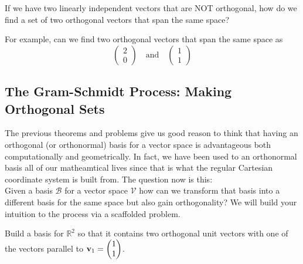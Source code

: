 \begin{problem}
    If we have two linearly independent vectors that are NOT orthogonal, how do
    we find a set of two orthogonal vectors that span the same space?

    For example, can we find two orthogonal vectors that span the same space as
    \[ \begin{pmatrix} 2 \\ 0 \end{pmatrix} \quad \text{and} \quad \begin{pmatrix} 1
        \\ 1 \end{pmatrix} \]
\end{problem}

\subsection{The Gram-Schmidt Process: Making Orthogonal Sets}
The previous theorems and problems give us good reason to think that having an orthogonal
(or orthonormal) basis for a vector space is advantageous both computationally and
geometrically.  In fact, we have been used to an orthonormal basis all of our matheamtical
lives since that is what the regular Cartesian coordinate system is built from.  The
question now is this: \\
Given a basis $\mathcal{B}$ for a vector space $\mathcal{V}$ how can we transform that
basis into a different basis for the same space but also gain orthogonality?
We will build your intuition to the process via a scaffolded problem.  

\begin{problem}
    Build a basis for $\mathbb{R}^2$ so that it contains two orthogonal unit vectors with
    one of the vectors parallel to ${\bf v}_1 = \begin{pmatrix} 1\\1\end{pmatrix}$.
\end{problem}

